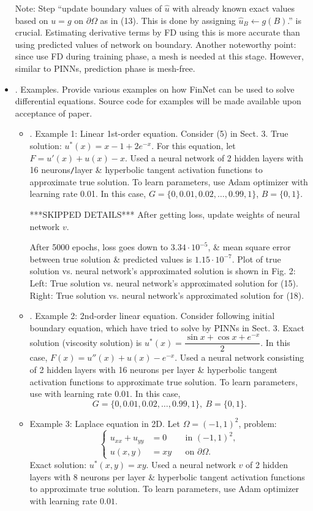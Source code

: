 \documentclass{article}
\begin{document}
\begin{itemize}
	Note: Step ``update boundary values of $\hat{u}$ with already known exact values based on $u = g$ on $\partial\Omega$ as in (13). This is done by assigning $\hat{u}_B\leftarrow g(B)$.'' is crucial. Estimating derivative terms by FD using this is more accurate than using predicted values of network on boundary. Another noteworthy point: since use FD during training phase, a mesh is needed at this stage. However, similar to PINNs, prediction phase is mesh-free.
	\item {. Examples.} Provide various examples on how FinNet can be used to solve differential equations. Source code for examples will be made available upon acceptance of paper.
	\begin{itemize}
		\item {. Example 1: Linear 1st-order equation.} Consider (5) in Sect. 3. True solution: $u^*(x) = x - 1 + 2e^{-x}$. For this equation, let $F = u'(x) + u(x) - x$. Used a neural network of 2 hidden layers with 16 neurons{\tt/}layer \& hyperbolic tangent activation functions to approximate true solution. To learn parameters, use Adam optimizer with learning rate 0.01. In this case, $G = \{0,0.01,0.02,\ldots,0.99,1\}$, $B = \{0,1\}$.

		***SKIPPED DETAILS***
		After getting loss, update weights of neural network $v$.

		After 5000 epochs, loss goes down to $3.34\cdot10^{-5}$, \& mean square error between true solution \& predicted values is $1.15\cdot10^{-7}$. Plot of true solution vs. neural network's approximated solution is shown in {\sf Fig. 2: Left: True solution vs. neural network's approximated solution for (15). Right: True solution vs. neural network's approximated solution for (18).}
		\item {. Example 2: 2nd-order linear equation.} Consider following initial boundary equation, which have tried to solve by PINNs in Sect. 3. Exact solution (viscosity solution) is $u^*(x) = \dfrac{\sin x + \cos x + e^{-x}}{2}$. In this case, $F(x) = u''(x) + u(x) - e^{-x}$. Used a neural network consisting of 2 hidden layers with 16 neurons per layer \& hyperbolic tangent activation functions to approximate true solution. To learn parameters, use  with learning rate $0.01$. In this case,
		\begin{equation*}
			G = \{0,0.01,0.02,\ldots,0.99,1\},\ B = \{0,1\}.
		\end{equation*}
		\item {\sf Example 3: Laplace equation in 2D.} Let $\Omega = (-1,1)^2$, problem:
		\begin{equation*}
			\left\{\begin{split}
				u_{xx} + u_{yy} &= 0&&\mbox{in }(-1,1)^2,\\
				u(x,y) &= xy&&\mbox{on }\partial\Omega.
			\end{split}\right.
		\end{equation*}
		Exact solution: $u^*(x,y) = xy$. Used a neural network $v$ of 2 hidden layers with 8 neurons per layer \& hyperbolic tangent activation functions to approximate true solution. To learn parameters, use Adam optimizer with learning rate $0.01$.


\end{itemize}
\end{itemize}
\end{document}
